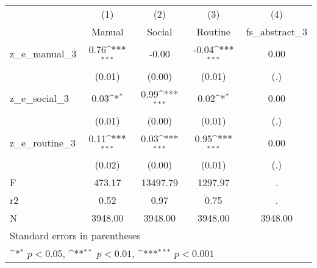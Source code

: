 {
\def\sym#1{\ifmmode^{#1}\else\(^{#1}\)\fi}
\begin{tabular}{l*{4}{c}}
\toprule
            &\multicolumn{1}{c}{(1)}&\multicolumn{1}{c}{(2)}&\multicolumn{1}{c}{(3)}&\multicolumn{1}{c}{(4)}\\
            &\multicolumn{1}{c}{Manual}&\multicolumn{1}{c}{Social}&\multicolumn{1}{c}{Routine}&\multicolumn{1}{c}{fs\_abstract\_3}\\
\midrule
z\_e\_manual\_3&        0.76\sym{***}&       -0.00         &       -0.04\sym{***}&        0.00         \\
            &      (0.01)         &      (0.00)         &      (0.01)         &         (.)         \\
\addlinespace
z\_e\_social\_3&        0.03\sym{*}  &        0.99\sym{***}&        0.02\sym{*}  &        0.00         \\
            &      (0.01)         &      (0.00)         &      (0.01)         &         (.)         \\
\addlinespace
z\_e\_routine\_3&        0.11\sym{***}&        0.03\sym{***}&        0.95\sym{***}&        0.00         \\
            &      (0.02)         &      (0.00)         &      (0.01)         &         (.)         \\
\midrule
F           &      473.17         &    13497.79         &     1297.97         &           .         \\
r2          &        0.52         &        0.97         &        0.75         &           .         \\
N           &     3948.00         &     3948.00         &     3948.00         &     3948.00         \\
\bottomrule
\multicolumn{5}{l}{\footnotesize Standard errors in parentheses}\\
\multicolumn{5}{l}{\footnotesize \sym{*} \(p<0.05\), \sym{**} \(p<0.01\), \sym{***} \(p<0.001\)}\\
\end{tabular}
}
